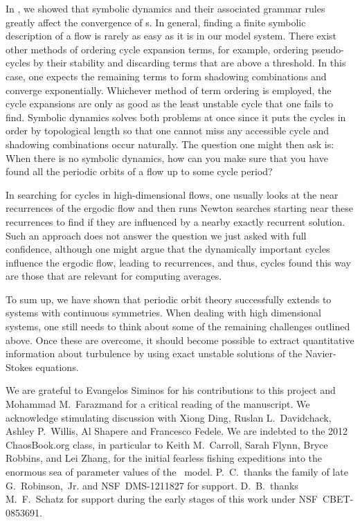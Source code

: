 \documentclass[aip,cha,
reprint,
secnumarabic,
nofootinbib, tightenlines,
nobibnotes, showkeys, showpacs,
superscriptaddress,
]{revtex4-1}
\begin{document}
{In , we showed that symbolic dynamics and their
associated grammar rules greatly affect the convergence of \cycForm s.
In general, finding a finite symbolic description of a flow is
rarely as easy as it is in our model system.
There exist other methods of ordering cycle
expansion terms, for example, ordering pseudo-cycles by their stability and discarding terms
that are above a threshold. In this case, one expects the remaining terms to form
shadowing combinations and converge exponentially.
Whichever method of term ordering is employed, the cycle expansions are only as good
as the least unstable cycle that one fails to find. Symbolic dynamics solves both 
problems at once since it puts the cycles in order by topological length so that
one cannot miss any accessible cycle and shadowing combinations occur naturally. 
The question one might then ask is: When there is no symbolic dynamics, how can you make 
sure that you have found all the periodic orbits of a flow up to some cycle period?

In searching for cycles in high-dimensional flows, one usually looks at
the near recurrences of the ergodic flow and then runs Newton searches
starting near these recurrences to find if they are influenced by a nearby exactly
recurrent solution. Such an approach does not answer the question we just asked with full
confidence, although one might argue that the dynamically important cycles
influence the ergodic flow, leading to recurrences, and thus, cycles found this way are
those that are relevant for computing averages.

To sum up, we have shown that periodic orbit theory successfully 
extends to systems with continuous symmetries. When dealing with 
high dimensional systems, one still needs to think about some of the 
remaining challenges outlined above. Once these are overcome, it 
should become possible to extract quantitative information about 
turbulence by using exact unstable solutions of the Navier-Stokes 
equations.


\begin{acknowledgments}
We are grateful to Evangelos Siminos for his contributions to this project
and Mohammad M.~Farazmand for a critical reading of the manuscript.
We acknowledge stimulating discussion with
Xiong Ding,
Ruslan L.~Davidchack,
Ashley P.~Willis,
Al Shapere
and
Francesco Fedele.
We are indebted to the 2012 ChaosBook.org class, in particular to
Keith M.~Carroll,
Sarah Flynn,
Bryce Robbins,
and
Lei Zhang,
for the initial fearless fishing expeditions into the enormous sea of
parameter values of the \twomode\ model.
P.~C.\ thanks the family of late G.~Robinson,~Jr.
and
NSF~DMS-1211827 for support. D.~B.\ thanks M.~F.\ Schatz for support during
the early stages of this work under NSF~CBET-0853691.
\end{acknowledgments}

}
\end{document}
